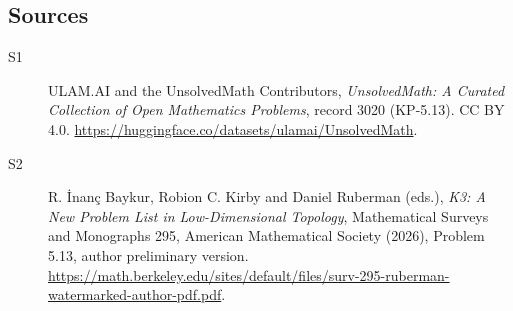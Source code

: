 \documentclass[11pt]{article}
\begin{document}
\subsection{Sources}
\begin{description}
\item[\hypertarget{source:3020:1}{S1}] ULAM.AI and the UnsolvedMath Contributors, \emph{UnsolvedMath: A Curated Collection of Open Mathematics Problems}, record 3020 (KP-5.13). CC BY 4.0. \url{https://huggingface.co/datasets/ulamai/UnsolvedMath}.
\item[\hypertarget{source:3020:2}{S2}] R. İnanç Baykur, Robion C. Kirby and Daniel Ruberman (eds.), \emph{K3: A New Problem List in Low-Dimensional Topology}, Mathematical Surveys and Monographs 295, American Mathematical Society (2026), Problem 5.13, author preliminary version. \url{https://math.berkeley.edu/sites/default/files/surv-295-ruberman-watermarked-author-pdf.pdf}.
\end{description}
\label{end:3020}
\end{document}
